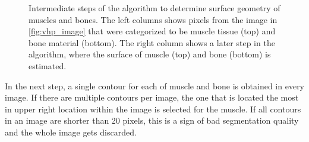 \begin{figure}
  \caption{Intermediate steps of the algorithm to determine surface geometry of muscles and bones. The left columns shows pixels from the image in \cref{fig:vhp_image} that were categorized to be muscle tissue (top) and bone material (bottom). The right column shows a later step in the algorithm, where the surface of muscle (top) and bone (bottom) is estimated.}%
  \label{fig:extraction}%
\end{figure}%

In the next step, a single contour for each of muscle and bone is obtained in every image. If there are multiple contours per image, the one that is located the most in upper right location within the image is selected for the muscle. If all contours in an image are shorter than 20 pixels, this is a sign of bad segmentation quality and the whole image gets discarded.

